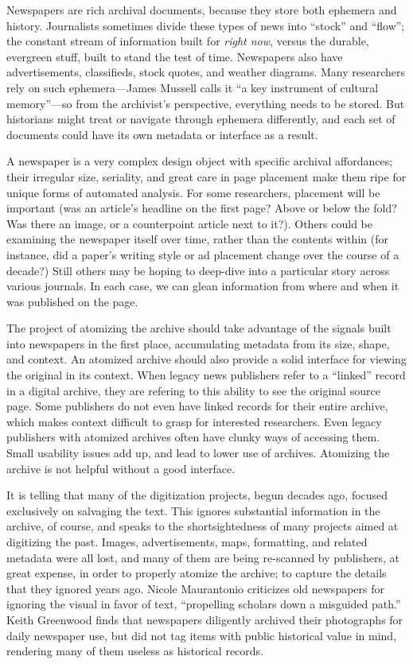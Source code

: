 Newspapers are rich archival documents, because they store both ephemera and history. Journalists sometimes divide these types of news into ``stock'' and ``flow''; the constant stream of information built for \emph{right now}, versus the durable, evergreen stuff, built to stand the test of time.\autocite{sloan_stock_2010} Newspapers also have advertisements, classifieds, stock quotes, and weather diagrams. Many researchers rely on such ephemera---James Mussell calls it ``a key instrument of cultural memory''---so from the archivist's perspective, everything needs to be stored.\autocite{mussell_passing_2012} But historians might treat or navigate through ephemera differently, and each set of documents could have its own metadata or interface as a result.

A newspaper is a very complex design object with specific archival affordances; their irregular size, seriality, and great care in page placement make them ripe for unique forms of automated analysis. For some researchers, placement will be important (was an article's headline on the first page? Above or below the fold? Was there an image, or a counterpoint article next to it?). Others could be examining the newspaper itself over time, rather than the contents within (for instance, did a paper's writing style or ad placement change over the course of a decade?) Still others may be hoping to deep-dive into a particular story across various journals. In each case, we can glean information from where and when it was published on the page.

The project of atomizing the archive should take advantage of the signals built into newspapers in the first place, accumulating metadata from its size, shape, and context. An atomized archive should also provide a solid interface for viewing the original in its context. When legacy news publishers refer to a ``linked'' record in a digital archive, they are refering to this ability to see the original source page. Some publishers do not even have linked records for their entire archive, which makes context difficult to grasp for interested researchers. Even legacy publishers with atomized archives often have clunky ways of accessing them. Small usability issues add up, and lead to lower use of archives. Atomizing the archive is not helpful without a good interface.

It is telling that many of the digitization projects, begun decades ago, focused exclusively on salvaging the text. This ignores substantial information in the archive, of course, and speaks to the shortsightedness of many projects aimed at digitizing the past. Images, advertisements, maps, formatting, and related metadata were all lost, and many of them are being re-scanned by publishers, at great expense, in order to properly atomize the archive; to capture the details that they ignored years ago. Nicole Maurantonio criticizes old newspapers for ignoring the visual in favor of text, ``propelling scholars down a misguided path.''\autocite[90]{maurantonio_archiving_2014} Keith Greenwood finds that newspapers diligently archived their photographs for daily newspaper use, but did not tag items with public historical value in mind, rendering many of them useless as historical records.\autocite{greenwood_digital_2011}

